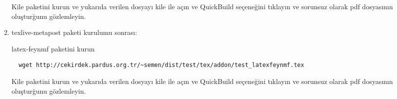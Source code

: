 \documentclass[a4paper,10pt]{article}
\begin{document}
\begin{enumerate}
Kile paketini kurun ve yukarıda verilen dosyayı kile ile açın ve QuickBuild  seçeneğini tıklayın ve sorunsuz olarak pdf dosyasının oluşturğunu gözlemleyin.

\item texlive-metapost paketi kurulumu sonrası:

latex-feynmf paketini kurun
\begin{verbatim}
  wget http://cekirdek.pardus.org.tr/~semen/dist/test/tex/addon/test_latexfeynmf.tex
\end{verbatim}

Kile paketini kurun ve yukarıda verilen dosyayı kile ile açın ve QuickBuild  seçeneğini tıklayın ve sorunsuz olarak pdf dosyasının oluşturğunu gözlemleyin.

\end{enumerate}
\end{document}
